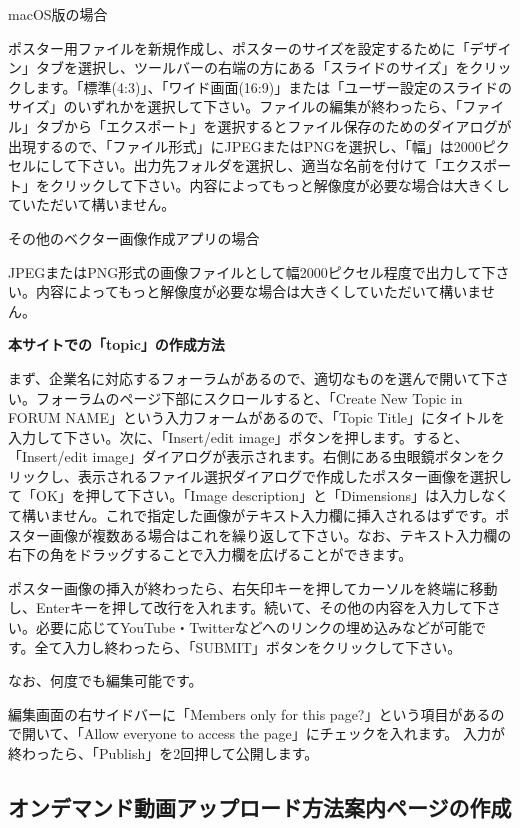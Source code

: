 \documentclass[titlepage,10pt,a4paper,uplatex]{jsbook}
\newenvironment{content}{\begin{shaded}\vspace{-1em}\raggedright\ttfamily\footnotesize\setlength{\baselineskip}{1.4em}}{\end{shaded}\vspace{-1em}}
\renewcommand{\textbf}[1]{{\bfseries\sffamily#1}}
\begin{document}
\begin{content}
{\large macOS版の場合}

ポスター用ファイルを新規作成し、ポスターのサイズを設定するために「デザイン」タブを選択し、ツールバーの右端の方にある「スライドのサイズ」をクリックします。「標準(4:3)」、「ワイド画面(16:9)」または「ユーザー設定のスライドのサイズ」のいずれかを選択して下さい。ファイルの編集が終わったら、「ファイル」タブから「エクスポート」を選択するとファイル保存のためのダイアログが出現するので、「ファイル形式」にJPEGまたはPNGを選択し、「幅」は2000ピクセルにして下さい。出力先フォルダを選択し、適当な名前を付けて「エクスポート」をクリックして下さい。内容によってもっと解像度が必要な場合は大きくしていただいて構いません。

{\Large その他のベクター画像作成アプリの場合}

JPEGまたはPNG形式の画像ファイルとして幅2000ピクセル程度で出力して下さい。内容によってもっと解像度が必要な場合は大きくしていただいて構いません。

\textbf{\Large 本サイトでの「topic」の作成方法}

まず、企業名に対応するフォーラムがあるので、適切なものを選んで開いて下さい。フォーラムのページ下部にスクロールすると、「Create New Topic in FORUM NAME」という入力フォームがあるので、「Topic Title」にタイトルを入力して下さい。次に、「Insert/edit image」ボタンを押します。すると、「Insert/edit image」ダイアログが表示されます。右側にある虫眼鏡ボタンをクリックし、表示されるファイル選択ダイアログで作成したポスター画像を選択して「OK」を押して下さい。「Image description」と「Dimensions」は入力しなくて構いません。これで指定した画像がテキスト入力欄に挿入されるはずです。ポスター画像が複数ある場合はこれを繰り返して下さい。なお、テキスト入力欄の右下の角をドラッグすることで入力欄を広げることができます。

ポスター画像の挿入が終わったら、右矢印キーを押してカーソルを終端に移動し、Enterキーを押して改行を入れます。続いて、その他の内容を入力して下さい。必要に応じてYouTube・Twitterなどへのリンクの埋め込みなどが可能です。全て入力し終わったら、「SUBMIT」ボタンをクリックして下さい。

なお、何度でも編集可能です。
\end{content}

編集画面の右サイドバーに「Members only for this page?」という項目があるので開いて、「Allow everyone to access the page」にチェックを入れます。
入力が終わったら、「Publish」を2回押して公開します。

\subsection{オンデマンド動画アップロード方法案内ページの作成}
\end{document}

